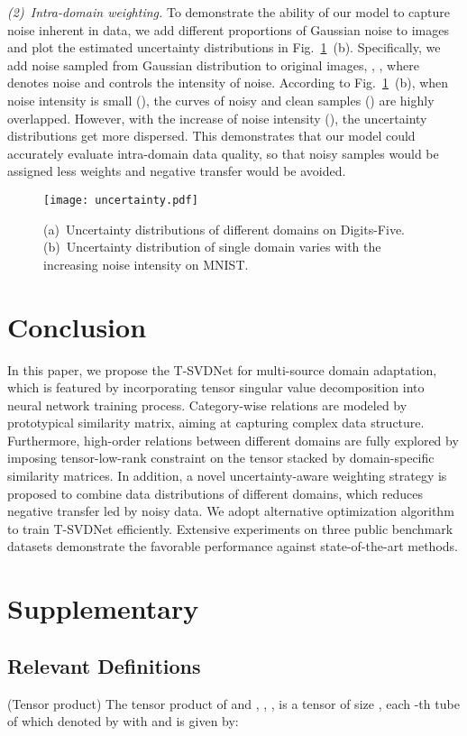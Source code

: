 \documentclass[10pt,twocolumn,letterpaper]{article}
\begin{document}
\textit{(2)~Intra-domain weighting.} To demonstrate the ability of our model to capture noise inherent in data, we add different proportions of Gaussian noise to images and plot the estimated uncertainty distributions in Fig.~\ref{fig5}~(b). Specifically, we add noise sampled from Gaussian distribution  to original images, \ie, , where  denotes noise and  controls the intensity of noise. According to Fig.~\ref{fig5}~(b), when noise intensity is small (), the curves of noisy and clean samples () are highly overlapped. However, with the increase of noise intensity (), the uncertainty distributions get more dispersed. This demonstrates that our model could accurately evaluate intra-domain data quality, so that noisy samples would be assigned less weights and negative transfer would be avoided.
\begin{figure}
	\centering
	\texttt{[image: uncertainty.pdf]}\\
	\caption{(a)~Uncertainty distributions of different domains on Digits-Five. (b)~Uncertainty distribution of single domain varies with the increasing noise intensity  on MNIST.}
	\label{fig5}
	\vspace{-1em}
\end{figure}
\section{Conclusion}
In this paper, we propose the T-SVDNet for multi-source domain adaptation, which is featured by incorporating tensor singular value decomposition into neural network training process. Category-wise relations are modeled by prototypical similarity matrix, aiming at capturing complex data structure. Furthermore, high-order relations between different domains are fully explored by imposing tensor-low-rank constraint on the tensor stacked by domain-specific similarity matrices. In addition, a novel uncertainty-aware weighting strategy is proposed to combine data distributions of different domains, which reduces negative transfer led by noisy data. We adopt alternative optimization algorithm to train T-SVDNet efficiently. Extensive experiments on three public benchmark datasets demonstrate the favorable performance against state-of-the-art methods. 

{\small
	
	
}
\section{Supplementary}
\subsection{Relevant Definitions}
{ (Tensor product) The tensor product  of  and , \ie, , is a tensor of size , each -th tube of which denoted by  with  and  is given by:}
\end{document}
